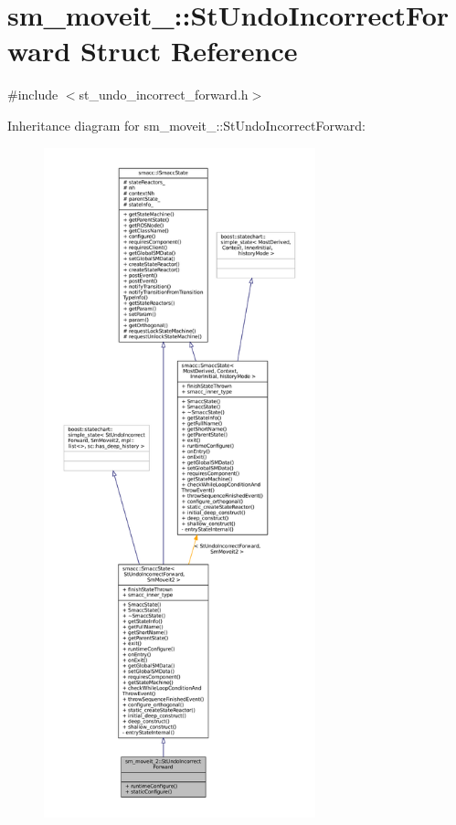\hypertarget{structsm__moveit__2_1_1StUndoIncorrectForward}{}\section{sm\+\_\+moveit\+\_\+:\+:St\+Undo\+Incorrect\+Forward Struct Reference}
\label{structsm__moveit__2_1_1StUndoIncorrectForward}


{\ttfamily \#include $<$st\+\_\+undo\+\_\+incorrect\+\_\+forward.\+h$>$}



Inheritance diagram for sm\+\_\+moveit\+\_\+:\+:St\+Undo\+Incorrect\+Forward\+:
\nopagebreak
\begin{figure}[H]
\begin{center}
\leavevmode
\includegraphics[height=550pt]{structsm__moveit__2_1_1StUndoIncorrectForward__inherit__graph}
\end{center}
\end{figure}


